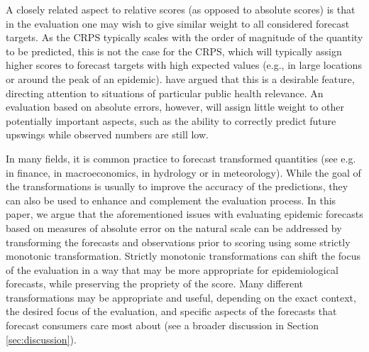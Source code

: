 \documentclass{article}
\begin{document}
A closely related aspect to relative scores (as opposed to absolute scores) is that in the evaluation one may wish to give similar weight to all considered forecast targets. As the CRPS typically scales with the order of magnitude of the quantity to be predicted, this is not the case for the CRPS, which will typically assign higher scores to forecast targets with high expected values (e.g., in large locations or around the peak of an epidemic). \cite{bracherEvaluatingEpidemicForecasts2021} have argued that this is a desirable feature, directing attention to situations of particular public health relevance. An evaluation based on absolute errors, however, will assign little weight to other potentially important aspects, such as the ability to correctly predict future upswings while observed numbers are still low. 

In many fields, it is common practice to forecast transformed quantities (see e.g. \cite{taylorEvaluatingVolatilityInterval1999} in finance, \cite{mayrLogLevelVAR2015} in macroeconomics, \cite{loweStochasticRainfallrunoffForecasting2014} in hydrology or \cite{fuglstadDoesNonstationarySpatial2015} in meteorology). While the goal of the transformations is usually to improve the accuracy of the predictions, they can also be used to enhance and complement the evaluation process. 
In this paper, we argue that the aforementioned issues with evaluating epidemic forecasts based on measures of absolute error on the natural scale can be addressed by transforming the forecasts and observations prior to scoring using some strictly monotonic transformation. Strictly monotonic transformations can shift the focus of the evaluation in a way that may be more appropriate for epidemiological forecasts, while preserving the propriety of the score. Many different transformations may be appropriate and useful, depending on the exact context, the desired focus of the evaluation, and specific aspects of the forecasts that forecast consumers care most about (see a broader discussion in Section \ref{sec:discussion}). 
\end{document}

